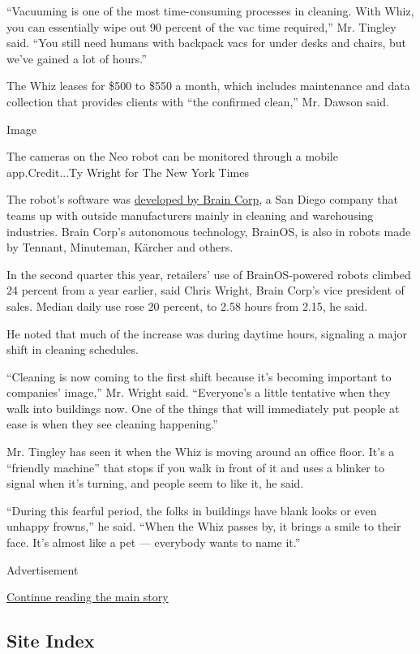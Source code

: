 ``Vacuuming is one of the most time-consuming processes in cleaning.
With Whiz, you can essentially wipe out 90 percent of the vac time
required,'' Mr. Tingley said. ``You still need humans with backpack vacs
for under desks and chairs, but we've gained a lot of hours.''

The Whiz leases for \$500 to \$550 a month, which includes maintenance
and data collection that provides clients with ``the confirmed clean,''
Mr. Dawson said.

Image

The cameras on the Neo robot can be monitored through a mobile
app.Credit...Ty Wright for The New York Times

The robot's software was
\href{https://www.nytimes.com/2020/04/10/business/coronavirus-workplace-automation.html}{developed
by Brain Corp}, a San Diego company that teams up with outside
manufacturers mainly in cleaning and warehousing industries. Brain
Corp's autonomous technology, BrainOS, is also in robots made by
Tennant, Minuteman, Kärcher and others.

In the second quarter this year, retailers' use of BrainOS-powered
robots climbed 24 percent from a year earlier, said Chris Wright, Brain
Corp's vice president of sales. Median daily use rose 20 percent, to
2.58 hours from 2.15, he said.

He noted that much of the increase was during daytime hours, signaling a
major shift in cleaning schedules.

``Cleaning is now coming to the first shift because it's becoming
important to companies' image,'' Mr. Wright said. ``Everyone's a little
tentative when they walk into buildings now. One of the things that will
immediately put people at ease is when they see cleaning happening.''

Mr. Tingley has seen it when the Whiz is moving around an office floor.
It's a ``friendly machine'' that stops if you walk in front of it and
uses a blinker to signal when it's turning, and people seem to like it,
he said.

``During this fearful period, the folks in buildings have blank looks or
even unhappy frowns,'' he said. ``When the Whiz passes by, it brings a
smile to their face. It's almost like a pet --- everybody wants to name
it.''

Advertisement

\protect\hyperlink{after-bottom}{Continue reading the main story}

\hypertarget{site-index}{%
\subsection{Site Index}\label{site-index}}

